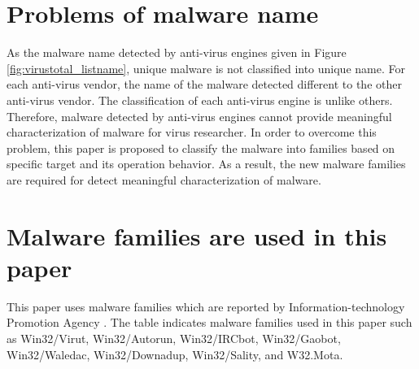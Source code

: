 \section{Problems of malware name} 
As the malware name detected by anti-virus engines given in Figure \ref{fig:virustotal_listname}, unique malware is not classified into unique name. For each anti-virus vendor, the name of the malware detected different to the other anti-virus vendor. The classification of each anti-virus engine is unlike others. Therefore, malware detected by anti-virus engines cannot provide meaningful characterization of malware for virus researcher. In order to overcome this problem, this paper is proposed to classify the malware into families based on specific target and its operation behavior. 
As a result, the new malware families are required for detect meaningful characterization of malware. 
\section{Malware families are used in this paper} 
This paper uses malware families which are reported by Information-technology Promotion Agency \cite{ipa}. The table indicates malware families used in this paper such as Win32/Virut, Win32/Autorun, Win32/IRCbot, Win32/Gaobot, Win32/Waledac, Win32/Downadup, Win32/Sality, and W32.Mota.

